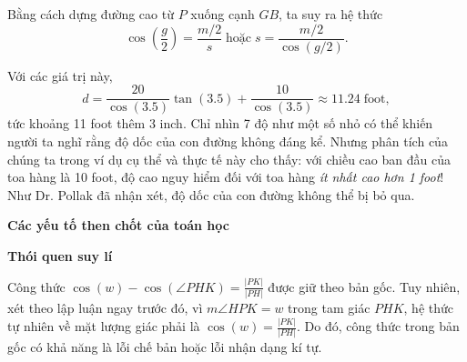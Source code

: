 {    Bằng cách dựng đường cao từ $P$ xuống cạnh $GB$, ta suy ra hệ thức
    $$
      \cos\left(\frac{g}{2}\right)=\frac{m/2}{s} \; \text{hoặc} \; s=\frac{m/2}{\cos(g/2)}.
    $$

    Với các giá trị này,
    $$
      d=\frac{20}{\cos(3.5)}\tan(3.5)+\frac{10}{\cos(3.5)}\approx 11.24 \; \text{foot},
    $$
    tức khoảng 11 foot thêm 3 inch. Chỉ nhìn 7 độ như một số nhỏ có thể khiến người ta nghĩ rằng độ dốc của con đường không đáng kể. Nhưng phân tích của chúng ta trong ví dụ cụ thể và thực tế này cho thấy: với chiều cao ban đầu của toa hàng là 10 foot, độ cao nguy hiểm đối với toa hàng \emph{ít nhất cao hơn 1 foot}! Như Dr. Pollak đã nhận xét, độ dốc của con đường không thể bị bỏ qua.

    \textbf{Các yếu tố then chốt của toán học}

    \begin{hanglist}

      \vspace{\baselineskip}

    \end{hanglist}

    \textbf{Thói quen suy lí}

    \begin{hanglist}

      \vspace{\baselineskip}


    \end{hanglist}
  }
  {
    Công thức $\cos(w)-\cos(\angle PHK)=\frac{\lvert PK\rvert}{\lvert PH\rvert}$ được giữ theo bản gốc. Tuy nhiên, xét theo lập luận ngay trước đó, vì $m\angle HPK=w$ trong tam giác $PHK$, hệ thức tự nhiên về mặt lượng giác phải là $\cos(w)=\frac{\lvert PK\rvert}{\lvert PH\rvert}$. Do đó, công thức trong bản gốc có khả năng là lỗi chế bản hoặc lỗi nhận dạng kí tự.
  }

